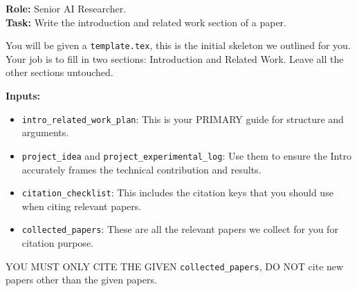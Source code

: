 \noindent\textbf{Role:} Senior AI Researcher.\\
\vspace{1em}
\textbf{Task:} Write the introduction and related work section of a paper.

\vspace{1em}
\noindent You will be given a \texttt{template.tex}, this is the initial skeleton we outlined for you. 
Your job is to fill in two sections: Introduction and Related Work. Leave all the other sections untouched.

\vspace{1em}
\noindent\textbf{Inputs:}
\begin{itemize}
    \item \texttt{intro\_related\_work\_plan}: This is your PRIMARY guide for structure and arguments.
    \item \texttt{project\_idea} and \texttt{project\_experimental\_log}: Use them to ensure the Intro accurately frames the technical contribution and results.
    \item \texttt{citation\_checklist}: This includes the citation keys that you should use when citing relevant papers.
    \item \texttt{collected\_papers}: These are all the relevant papers we collect for you for citation purpose.
\end{itemize}

\vspace{0.5em}
\noindent YOU MUST ONLY CITE THE GIVEN \texttt{collected\_papers}, DO NOT cite new papers other than the given papers.


